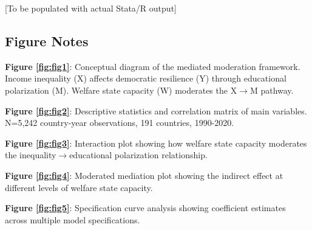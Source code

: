 \documentclass[11pt,letterpaper]{article}
\begin{document}
[To be populated with actual Stata/R output]

\subsection{Figure Notes}

\textbf{Figure \ref{fig:fig1}}: Conceptual diagram of the mediated moderation framework. Income inequality (X) affects democratic resilience (Y) through educational polarization (M). Welfare state capacity (W) moderates the X$\rightarrow$M pathway.

\textbf{Figure \ref{fig:fig2}}: Descriptive statistics and correlation matrix of main variables. N=5,242 country-year observations, 191 countries, 1990-2020.

\textbf{Figure \ref{fig:fig3}}: Interaction plot showing how welfare state capacity moderates the inequality$\rightarrow$educational polarization relationship.

\textbf{Figure \ref{fig:fig4}}: Moderated mediation plot showing the indirect effect at different levels of welfare state capacity.

\textbf{Figure \ref{fig:fig5}}: Specification curve analysis showing coefficient estimates across multiple model specifications.

\newpage


\end{document}
